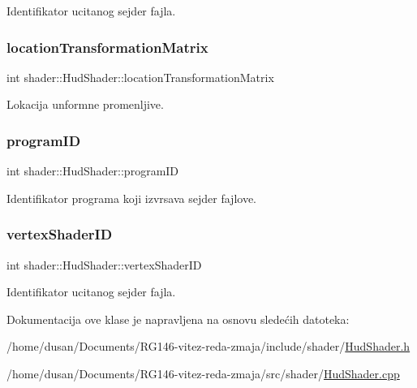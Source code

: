 Identifikator ucitanog sejder fajla. 

\mbox{\label{classshader_1_1HudShader_a12942279494ff23209eeb01af8e861e5}} 
\subsubsection{\texorpdfstring{location\+Transformation\+Matrix}{locationTransformationMatrix}}
{\footnotesize\ttfamily int shader\+::\+Hud\+Shader\+::location\+Transformation\+Matrix\hspace{0.3cm}{\ttfamily [private]}}



Lokacija unformne promenljive. 

\mbox{\label{classshader_1_1HudShader_ab5aa088991bd6559ba174f553977342f}} 
\subsubsection{\texorpdfstring{program\+ID}{programID}}
{\footnotesize\ttfamily int shader\+::\+Hud\+Shader\+::program\+ID\hspace{0.3cm}{\ttfamily [private]}}



Identifikator programa koji izvrsava sejder fajlove. 

\mbox{\label{classshader_1_1HudShader_a02815d5a104a7d94707cfdf33d8bf22c}} 
\subsubsection{\texorpdfstring{vertex\+Shader\+ID}{vertexShaderID}}
{\footnotesize\ttfamily int shader\+::\+Hud\+Shader\+::vertex\+Shader\+ID\hspace{0.3cm}{\ttfamily [private]}}



Identifikator ucitanog sejder fajla. 



Dokumentacija ove klase je napravljena na osnovu sledećih datoteka\+:\begin{DoxyCompactItemize}
\item 
/home/dusan/\+Documents/\+R\+G146-\/vitez-\/reda-\/zmaja/include/shader/\hyperlink{HudShader_8h}{Hud\+Shader.\+h}\item 
/home/dusan/\+Documents/\+R\+G146-\/vitez-\/reda-\/zmaja/src/shader/\hyperlink{HudShader_8cpp}{Hud\+Shader.\+cpp}\end{DoxyCompactItemize}
